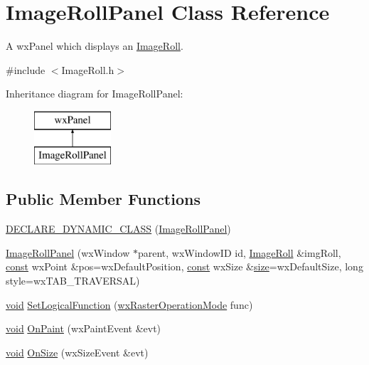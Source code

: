 \hypertarget{class_image_roll_panel}{}\section{Image\+Roll\+Panel Class Reference}
\label{class_image_roll_panel}


A wx\+Panel which displays an \hyperlink{class_image_roll}{Image\+Roll}.  




{\ttfamily \#include $<$Image\+Roll.\+h$>$}

Inheritance diagram for Image\+Roll\+Panel\+:\begin{figure}[H]
\begin{center}
\leavevmode
\includegraphics[height=2.000000cm]{class_image_roll_panel}
\end{center}
\end{figure}
\subsection*{Public Member Functions}
\begin{DoxyCompactItemize}
\item 
\hyperlink{class_image_roll_panel_ab894ec985575e61e9296f48e168e4331}{D\+E\+C\+L\+A\+R\+E\+\_\+\+D\+Y\+N\+A\+M\+I\+C\+\_\+\+C\+L\+A\+SS} (\hyperlink{class_image_roll_panel}{Image\+Roll\+Panel})
\item 
\hyperlink{class_image_roll_panel_a9b5ce6e7c5d4f52617d532a86057fc23}{Image\+Roll\+Panel} (wx\+Window $\ast$parent, wx\+Window\+ID id, \hyperlink{class_image_roll}{Image\+Roll} \&img\+Roll, \hyperlink{getopt1_8c_a2c212835823e3c54a8ab6d95c652660e}{const} wx\+Point \&pos=wx\+Default\+Position, \hyperlink{getopt1_8c_a2c212835823e3c54a8ab6d95c652660e}{const} wx\+Size \&\hyperlink{group__lavu__mem_ga854352f53b148adc24983a58a1866d66}{size}=wx\+Default\+Size, long style=wx\+T\+A\+B\+\_\+\+T\+R\+A\+V\+E\+R\+S\+AL)
\item 
\hyperlink{sound_8c_ae35f5844602719cf66324f4de2a658b3}{void} \hyperlink{class_image_roll_panel_ae28588499574273fe52b6b0c1ae83730}{Set\+Logical\+Function} (\hyperlink{_image_roll_8h_a3bd7816d34a03863743710178ff6be2d}{wx\+Raster\+Operation\+Mode} func)
\item 
\hyperlink{sound_8c_ae35f5844602719cf66324f4de2a658b3}{void} \hyperlink{class_image_roll_panel_a996968fc5a5d714d0751385914305b31}{On\+Paint} (wx\+Paint\+Event \&evt)
\item 
\hyperlink{sound_8c_ae35f5844602719cf66324f4de2a658b3}{void} \hyperlink{class_image_roll_panel_aa9bbd4f2c36bdf52e41a7684adac8fb7}{On\+Size} (wx\+Size\+Event \&evt)
\end{DoxyCompactItemize}
